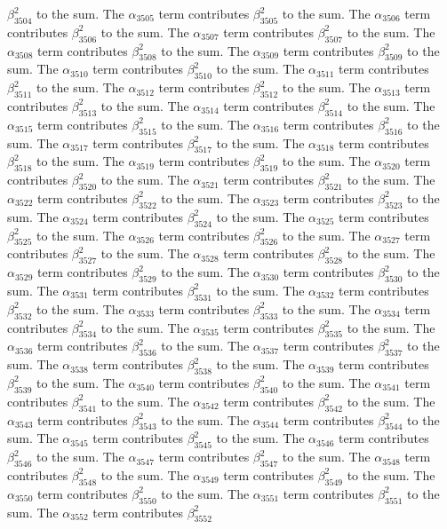 \begin{lemma}
$\beta_{3504}^{2}$ to the sum. The $\alpha_{3505}$ term contributes $\beta_{3505}^{2}$ to the sum. The $\alpha_{3506}$ term contributes $\beta_{3506}^{2}$ to the sum. The $\alpha_{3507}$ term contributes $\beta_{3507}^{2}$ to the sum. The $\alpha_{3508}$ term contributes $\beta_{3508}^{2}$ to the sum. The $\alpha_{3509}$ term contributes $\beta_{3509}^{2}$ to the sum. The $\alpha_{3510}$ term contributes $\beta_{3510}^{2}$ to the sum. The $\alpha_{3511}$ term contributes $\beta_{3511}^{2}$ to the sum. The $\alpha_{3512}$ term contributes $\beta_{3512}^{2}$ to the sum. The $\alpha_{3513}$ term contributes $\beta_{3513}^{2}$ to the sum. The $\alpha_{3514}$ term contributes $\beta_{3514}^{2}$ to the sum. The $\alpha_{3515}$ term contributes $\beta_{3515}^{2}$ to the sum. The $\alpha_{3516}$ term contributes $\beta_{3516}^{2}$ to the sum. The $\alpha_{3517}$ term contributes $\beta_{3517}^{2}$ to the sum. The $\alpha_{3518}$ term contributes $\beta_{3518}^{2}$ to the sum. The $\alpha_{3519}$ term contributes $\beta_{3519}^{2}$ to the sum. The $\alpha_{3520}$ term contributes $\beta_{3520}^{2}$ to the sum. The $\alpha_{3521}$ term contributes $\beta_{3521}^{2}$ to the sum. The $\alpha_{3522}$ term contributes $\beta_{3522}^{2}$ to the sum. The $\alpha_{3523}$ term contributes $\beta_{3523}^{2}$ to the sum. The $\alpha_{3524}$ term contributes $\beta_{3524}^{2}$ to the sum. The $\alpha_{3525}$ term contributes $\beta_{3525}^{2}$ to the sum. The $\alpha_{3526}$ term contributes $\beta_{3526}^{2}$ to the sum. The $\alpha_{3527}$ term contributes $\beta_{3527}^{2}$ to the sum. The $\alpha_{3528}$ term contributes $\beta_{3528}^{2}$ to the sum. The $\alpha_{3529}$ term contributes $\beta_{3529}^{2}$ to the sum. The $\alpha_{3530}$ term contributes $\beta_{3530}^{2}$ to the sum. The $\alpha_{3531}$ term contributes $\beta_{3531}^{2}$ to the sum. The $\alpha_{3532}$ term contributes $\beta_{3532}^{2}$ to the sum. The $\alpha_{3533}$ term contributes $\beta_{3533}^{2}$ to the sum. The $\alpha_{3534}$ term contributes $\beta_{3534}^{2}$ to the sum. The $\alpha_{3535}$ term contributes $\beta_{3535}^{2}$ to the sum. The $\alpha_{3536}$ term contributes $\beta_{3536}^{2}$ to the sum. The $\alpha_{3537}$ term contributes $\beta_{3537}^{2}$ to the sum. The $\alpha_{3538}$ term contributes $\beta_{3538}^{2}$ to the sum. The $\alpha_{3539}$ term contributes $\beta_{3539}^{2}$ to the sum. The $\alpha_{3540}$ term contributes $\beta_{3540}^{2}$ to the sum. The $\alpha_{3541}$ term contributes $\beta_{3541}^{2}$ to the sum. The $\alpha_{3542}$ term contributes $\beta_{3542}^{2}$ to the sum. The $\alpha_{3543}$ term contributes $\beta_{3543}^{2}$ to the sum. The $\alpha_{3544}$ term contributes $\beta_{3544}^{2}$ to the sum. The $\alpha_{3545}$ term contributes $\beta_{3545}^{2}$ to the sum. The $\alpha_{3546}$ term contributes $\beta_{3546}^{2}$ to the sum. The $\alpha_{3547}$ term contributes $\beta_{3547}^{2}$ to the sum. The $\alpha_{3548}$ term contributes $\beta_{3548}^{2}$ to the sum. The $\alpha_{3549}$ term contributes $\beta_{3549}^{2}$ to the sum. The $\alpha_{3550}$ term contributes $\beta_{3550}^{2}$ to the sum. The $\alpha_{3551}$ term contributes $\beta_{3551}^{2}$ to the sum. The $\alpha_{3552}$ term contributes $\beta_{3552}^{2}$ 
\end{lemma}
